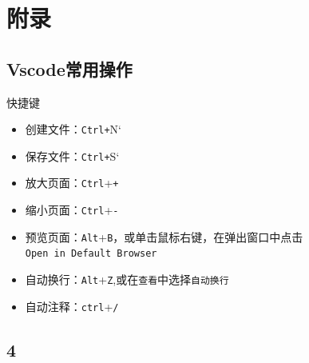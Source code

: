 \documentclass[
]{book}
\providecommand{\tightlist}{%
  \setlength{\itemsep}{0pt}\setlength{\parskip}{0pt}}
\begin{document}
\hypertarget{part-ux9644ux5f55}{%
\part{附录}\label{part-ux9644ux5f55}}

\hypertarget{vscodeux5e38ux7528ux64cdux4f5c}{%
\chapter{Vscode常用操作}\label{vscodeux5e38ux7528ux64cdux4f5c}}

快捷键

\begin{itemize}
\tightlist
\item
  创建文件：\texttt{Ctrl+}N`
\item
  保存文件：\texttt{Ctrl+}S`
\item
  放大页面：\texttt{Ctrl}+\texttt{+}
\item
  缩小页面：\texttt{Ctrl}+\texttt{-}
\item
  预览页面：\texttt{Alt}+\texttt{B}，或单击鼠标右键，在弹出窗口中点击\texttt{Open\ in\ Default\ Browser}
\item
  自动换行：\texttt{Alt}+\texttt{Z},或在\texttt{查看}中选择\texttt{自动换行}
\item
  自动注释：\texttt{ctrl}+\texttt{/}
\end{itemize}

\hypertarget{section}{%
\chapter{4}\label{section}}

\printbibliography
\end{document}

